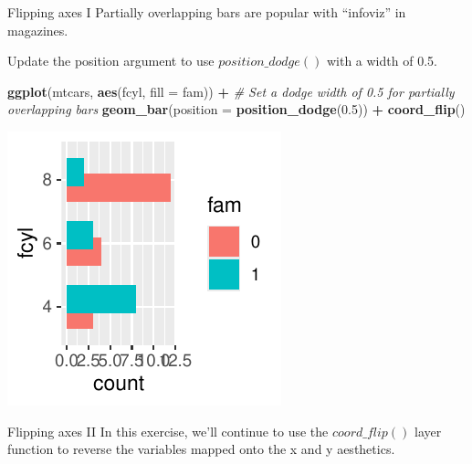 \documentclass[
  ignorenonframetext,
]{beamer}
\newenvironment{Shaded}{\begin{snugshade}}{\end{snugshade}}
\newcommand{\AttributeTok}[1]{\textcolor[rgb]{0.13,0.29,0.53}{#1}}
\newcommand{\CommentTok}[1]{\textcolor[rgb]{0.56,0.35,0.01}{\textit{#1}}}
\newcommand{\FloatTok}[1]{\textcolor[rgb]{0.00,0.00,0.81}{#1}}
\newcommand{\FunctionTok}[1]{\textcolor[rgb]{0.13,0.29,0.53}{\textbf{#1}}}
\newcommand{\NormalTok}[1]{#1}
\newcommand{\SpecialCharTok}[1]{\textcolor[rgb]{0.81,0.36,0.00}{\textbf{#1}}}
\begin{document}
\begin{frame}[fragile]{Flipping axes I}
\label{flipping-axes-i-4}
Partially overlapping bars are popular with ``infoviz'' in magazines.

Update the position argument to use \(position\_dodge()\) with a width
of 0.5.


\begin{Shaded}
\begin{Highlighting}[]
\FunctionTok{ggplot}\NormalTok{(mtcars, }\FunctionTok{aes}\NormalTok{(fcyl, }\AttributeTok{fill =}\NormalTok{ fam)) }\SpecialCharTok{+}  \CommentTok{\# Set a dodge width of 0.5 for partially overlapping bars}
  \FunctionTok{geom\_bar}\NormalTok{(}\AttributeTok{position =} \FunctionTok{position\_dodge}\NormalTok{(}\FloatTok{0.5}\NormalTok{)) }\SpecialCharTok{+}
  \FunctionTok{coord\_flip}\NormalTok{()}
\end{Highlighting}
\end{Shaded}

\begin{center}\includegraphics[width=0.5\linewidth]{Figs/unnamed-chunk-61-1} \end{center}
\end{frame}

\begin{frame}{Flipping axes II}
\label{flipping-axes-ii}
In this exercise, we'll continue to use the \(coord\_flip()\) layer
function to reverse the variables mapped onto the x and y aesthetics.
\end{frame}
\end{document}
